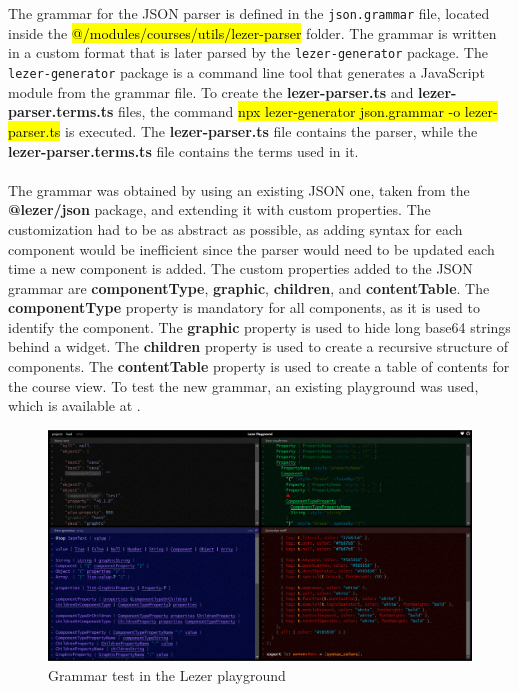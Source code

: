 \\\\
\noindent The grammar for the JSON parser is defined in the \texttt{json.grammar} file, located inside the \hl{@/modules/courses/utils/lezer-parser} folder. The grammar is written in a custom format that is later parsed by the \texttt{lezer-generator} package. The \texttt{lezer-generator} package is a command line tool that generates a JavaScript module from the grammar file. To create the \textbf{lezer-parser.ts} and \textbf{lezer-parser.terms.ts} files, the command \hl{npx lezer-generator json.grammar -o lezer-parser.ts} is executed. The \textbf{lezer-parser.ts} file contains the parser, while the \textbf{lezer-parser.terms.ts} file contains the terms used in it.
\\\\
\noindent The grammar was obtained by using an existing JSON one, taken from the \textbf{@lezer/json} package, and extending it with custom properties. The customization had to be as abstract as possible, as adding syntax for each component would be inefficient since the parser would need to be updated each time a new component is added. The custom properties added to the JSON grammar are \textbf{componentType}, \textbf{graphic}, \textbf{children}, and \textbf{contentTable}. The \textbf{componentType} property is mandatory for all components, as it is used to identify the component. The \textbf{graphic} property is used to hide long base64 strings behind a widget. The \textbf{children} property is used to create a recursive structure of components. The \textbf{contentTable} property is used to create a table of contents for the course view. To test the new grammar, an existing playground was used, which is available at \cite{lezer-playground}.

\begin{figure}[h]
    \centering
    \includegraphics[scale=0.35]{images/lezer-playground.png}
    \caption{Grammar test in the Lezer playground \cite{lezer-playground}}
    \label{fig:lezer-playground}
\end{figure}

